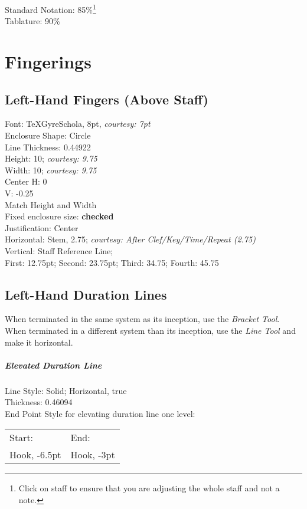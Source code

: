 \documentclass[]{memoir}
\begin{document}
Standard Notation: 85\%\footnote{Click on staff to ensure that you are adjusting the whole staff and not a note.}\\

\noindent Tablature: 90\%

\chapter{Fingerings}
\label{sec:fingerings}

\section{Left-Hand Fingers (Above Staff)}
\label{sec:left-hand-fingers}

Font: TeXGyreSchola, 8pt, \emph{courtesy: 7pt}\\
Enclosure Shape: Circle\\
Line Thickness: 0.44922\\
Height: 10; \emph{courtesy: 9.75}\\
Width: 10; \emph{courtesy: 9.75}\\
Center H: 0\\
V: -0.25\\
Match Height and Width\\
Fixed enclosure size: \textbf{checked}\\
Justification: Center\\
Horizontal: Stem, 2.75; \emph{courtesy: After Clef/Key/Time/Repeat (2.75)}\\
Vertical: Staff Reference Line;\\
First: 12.75pt; Second: 23.75pt; Third: 34.75; Fourth: 45.75

\section{Left-Hand Duration Lines}
\label{sec:left-hand-duration}

When terminated in the same system as its inception, use the \emph{Bracket Tool}.\\
When terminated in a different system than its inception, use the \emph{Line Tool} and make it horizontal.

\paragraph{Elevated Duration Line}
\label{sec:elev-durat-line}

Line Style: Solid; Horizontal, true\\
Thickness: 0.46094\\
End Point Style for elevating duration line one level:\\
\begin{tabular}{l l}
  Start: & End:\\
  Hook, -6.5pt & Hook, -3pt\\
\end{tabular}
\end{document}
